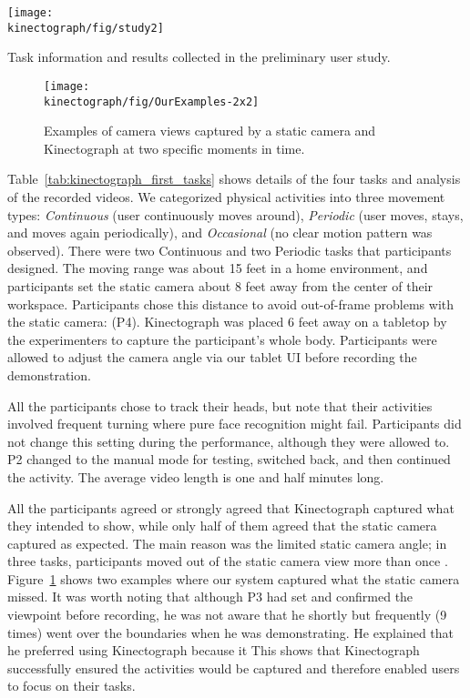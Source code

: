 \begin{table}[b!]
     \centering
    \texttt{[image: \\kinectograph/fig/study2]}
    \caption{Task information and results collected in the preliminary user study.}
    \label{tab:kinectograph_first_tasks}
 \end{table}

\begin{figure}[t!]
     \centering
    \texttt{[image: \\kinectograph/fig/OurExamples-2x2]}
    \caption{Examples of camera views captured by a static camera and Kinectograph at two specific moments in time.}
    \label{fig:kinectograph_dance}
\end{figure}

Table~\ref{tab:kinectograph_first_tasks} shows details of the four tasks and analysis of the recorded videos. We categorized physical activities into three movement types: \emph{Continuous} (user continuously moves around), \emph{Periodic} (user moves, stays, and moves again periodically), and \emph{Occasional} (no clear motion pattern was observed).
%
There were two Continuous and two Periodic tasks that participants designed. The moving range was about 15 feet in a home environment, and participants set the static camera about 8 feet away from the center of their workspace. Participants chose this distance to avoid out-of-frame problems with the static camera:  (P4). Kinectograph was placed 6 feet away on a tabletop by the experimenters to capture the participant's whole body. Participants were allowed to adjust the camera angle via our tablet UI before recording the demonstration.

All the participants chose to track their heads, but note
that their activities involved frequent turning where
pure face recognition might fail. Participants did not
change this setting during the performance, although
they were allowed to. P2 changed to the manual mode
for testing, switched back, and then continued the
activity. The average video length is one and half
minutes long.

All the participants agreed or strongly agreed that
Kinectograph captured what they intended to show,
while only half of them agreed that the static camera
captured as expected. The main reason was the
limited static camera angle; in three tasks, participants
moved out of the static camera view more than once
. Figure~\ref{fig:kinectograph_dance} shows two examples where our system
captured what the static camera missed. It was worth
noting that although P3 had set and confirmed the
viewpoint before recording, he was not aware that he
shortly but frequently (9 times) went over the
boundaries when he was demonstrating. He explained
that he preferred using Kinectograph because it  This shows that Kinectograph successfully
ensured the activities would be captured and therefore
enabled users to focus on their tasks.

